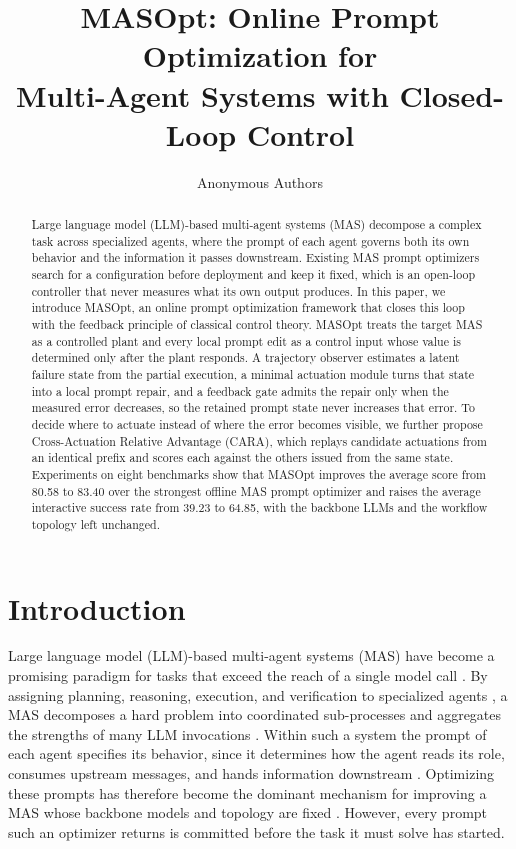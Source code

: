 \documentclass{article}
\title{MASOpt: Online Prompt Optimization for\\ Multi-Agent Systems with Closed-Loop Control}
\author{Anonymous Authors}
\theoremstyle{definition}
\begin{document}
\maketitle

\begin{abstract}
Large language model (LLM)-based multi-agent systems (MAS) decompose a complex task across specialized agents, where the prompt of each agent governs both its own behavior and the information it passes downstream. Existing MAS prompt optimizers search for a configuration before deployment and keep it fixed, which is an open-loop controller that never measures what its own output produces. In this paper, we introduce MASOpt, an online prompt optimization framework that closes this loop with the feedback principle of classical control theory. MASOpt treats the target MAS as a controlled plant and every local prompt edit as a control input whose value is determined only after the plant responds. A trajectory observer estimates a latent failure state from the partial execution, a minimal actuation module turns that state into a local prompt repair, and a feedback gate admits the repair only when the measured error decreases, so the retained prompt state never increases that error. To decide where to actuate instead of where the error becomes visible, we further propose Cross-Actuation Relative Advantage (CARA), which replays candidate actuations from an identical prefix and scores each against the others issued from the same state. Experiments on eight benchmarks show that MASOpt improves the average score from 80.58 to 83.40 over the strongest offline MAS prompt optimizer and raises the average interactive success rate from 39.23 to 64.85, with the backbone LLMs and the workflow topology left unchanged.
\end{abstract}

\section{Introduction}
\label{sec:introduction}

Large language model (LLM)-based multi-agent systems (MAS) have become a promising paradigm for tasks that exceed the reach of a single model call \citep{wu2023autogen,li2023camel,chen2023agentverse,yao2024multiagent}. By assigning planning, reasoning, execution, and verification to specialized agents \citep{li2023camel,chen2023agentverse}, a MAS decomposes a hard problem into coordinated sub-processes and aggregates the strengths of many LLM invocations \citep{wu2023autogen,zhang2024aflow}. Within such a system the prompt of each agent specifies its behavior, since it determines how the agent reads its role, consumes upstream messages, and hands information downstream \citep{khattab2024dspy,yuksekgonul2024textgrad}. Optimizing these prompts has therefore become the dominant mechanism for improving a MAS whose backbone models and topology are fixed \citep{mapro2026,hong2026maspob,wang2026maspo}. However, every prompt such an optimizer returns is committed before the task it must solve has started.
\end{document}

